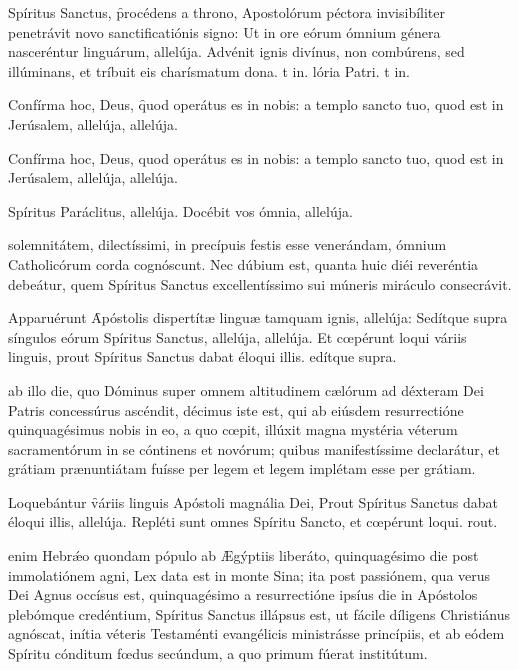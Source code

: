 \documentclass[fontsize=9pt,paper=A6,twoside,BCOR=1mm,DIV=22,headinclude]{scrarticle}
\begin{document}
\begin{multicols}{2}
\R Spíritus Sanctus, \f procédens a throno, Apostolórum péctora invisibíliter penetrávit novo sanctificatiónis signo:
\red{*} Ut in ore eórum ómnium génera nasceréntur linguárum, allelúja.
\V Advénit ignis divínus, non combúrens, sed illúminans, et tríbuit eis charísmatum dona.
t in.
lória Patri.
t in.


\A Confírma hoc, Deus, \f quod operátus es in nobis: a templo sancto tuo, quod est in Jerúsalem, allelúja, allelúja.













\A Confírma hoc, Deus, quod operátus es in nobis: a templo sancto tuo, quod est in Jerúsalem, allelúja, allelúja.

\V Spíritus Paráclitus, allelúja.
\R Docébit vos ómnia, allelúja.

 solemnitátem, dilectíssimi, in precípuis festis esse venerándam, ómnium Catholicórum corda cognóscunt. Nec dúbium est, quanta huic diéi reveréntia debeátur, quem Spíritus Sanctus excellentíssimo sui múneris miráculo consecrávit.

\R Apparuérunt \f Apóstolis dispertítæ linguæ tamquam ignis, allelúja:
\red{*} Sedítque supra síngulos eórum Spíritus Sanctus, allelúja, allelúja.
\V Et cœpérunt loqui váriis linguis, prout Spíritus Sanctus dabat éloqui illis.
edítque supra.

 ab illo die, quo Dóminus super omnem altitudinem cælórum ad déxteram Dei Patris concessúrus ascéndit, décimus iste est, qui ab eiúsdem resurrectióne quinquagésimus nobis in eo, a quo cœpit, illúxit magna mystéria véterum sacramentórum in se cóntinens et novórum; quibus manifestíssime declarátur, et grátiam prænuntiátam fuísse per legem et legem implétam esse per grátiam.

\R Loquebántur \f váriis linguis Apóstoli magnália Dei,
\red{*} Prout Spíritus Sanctus dabat éloqui illis, allelúja.
\V Repléti sunt omnes Spíritu Sancto, et cœpérunt loqui.
rout.

{
 enim Hebrǽo quondam pópulo ab Ægýptiis liberáto, quinquagésimo die post immolatiónem agni, Lex data est in monte Sina; ita post passiónem, qua verus Dei Agnus occísus est, quinquagésimo a resurrectióne ipsíus die in Apóstolos plebómque credéntium, Spíritus Sanctus illápsus est, ut fácile díligens Christiánus agnóscat, inítia véteris Testaménti evangélicis ministrásse princípiis, et ab eódem Spíritu cónditum fœdus secúndum, a quo primum fúerat institútum.

}
\end{multicols}
\end{document}
